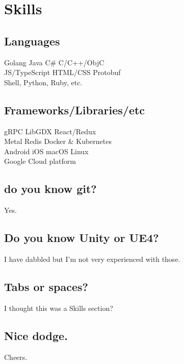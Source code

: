 \documentclass[]{deedy-resume-openfont}
\begin{document}
%
%



%
%

\begin{minipage}[t]{0.33\textwidth} 


\section{Skills}
\subsection{Languages}
Golang \textbullet{}   Java \textbullet{} C\# \textbullet{} C/C++/ObjC \\
JS/TypeScript \textbullet{} HTML/CSS \textbullet{} Protobuf \\
Shell, Python, Ruby, etc.
\sectionsep
\subsection{Frameworks/Libraries/etc}
gRPC \textbullet{} LibGDX \textbullet{} React/Redux \\
Metal \textbullet{} Redis \textbullet{} Docker \& Kubernetes\\
Android \textbullet{} iOS \textbullet{} macOS \textbullet{} Linux\\
Google Cloud platform
\sectionsep
\subsection{do you know git?}
Yes.
\sectionsep
\subsection{Do you know Unity or UE4?}
I have dabbled but I'm not very experienced with those.
\sectionsep
\subsection{Tabs or spaces?}
I thought this was a Skills section?
\sectionsep
\subsection{Nice dodge.}
Cheers.
\sectionsep


\end{minipage}
\end{document}
